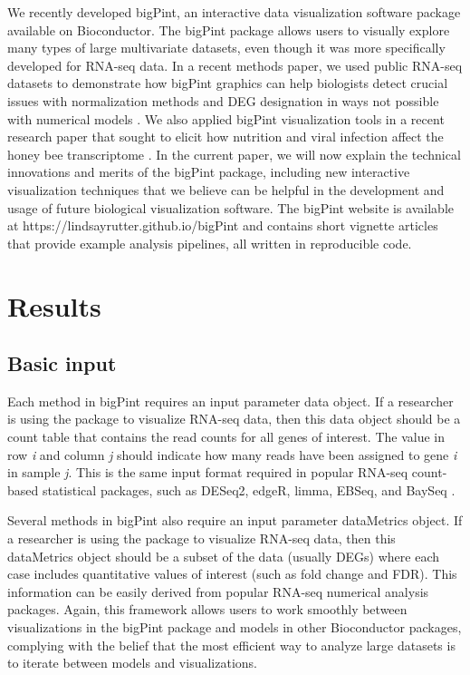 \documentclass[parskip=full]{bmcart} %
\begin{document}
We recently developed bigPint, an interactive data visualization software package available on Bioconductor. The bigPint package allows users to visually explore many types of large multivariate datasets, even though it was more specifically developed for RNA-seq data. In a recent methods paper, we used public RNA-seq datasets to demonstrate how bigPint graphics can help biologists detect crucial issues with normalization methods and DEG designation in ways not possible with numerical models \cite{rutter1}. We also applied bigPint visualization tools in a recent research paper that sought to elicit how nutrition and viral infection affect the honey bee transcriptome \cite{rutter2}. In the current paper, we will now explain the technical innovations and merits of the bigPint package, including new interactive visualization techniques that we believe can be helpful in the development and usage of future biological visualization software. The bigPint website is available at https://lindsayrutter.github.io/bigPint and contains short vignette articles that provide example analysis pipelines, all written in reproducible code.

\section*{Results}

\subsection*{Basic input}

Each method in bigPint requires an input parameter data object. If a researcher is using the package to visualize RNA-seq data, then this data object should be a count table that contains the read counts for all genes of interest. The value in row \textit{i} and column \textit{j} should indicate how many reads have been assigned to gene \textit{i} in sample \textit{j}. This is the same input format required in popular RNA-seq count-based statistical packages, such as DESeq2, edgeR, limma, EBSeq, and BaySeq \cite{deseq2, edger, limma, ebseq, bayseq}. 

Several methods in bigPint also require an input parameter dataMetrics object. If a researcher is using the package to visualize RNA-seq data, then this dataMetrics object should be a subset of the data (usually DEGs) where each case includes quantitative values of interest (such as fold change and FDR). This information can be easily derived from popular RNA-seq numerical analysis packages. Again, this framework allows users to work smoothly between visualizations in the bigPint package and models in other Bioconductor packages, complying with the belief that the most efficient way to analyze large datasets is to iterate between models and visualizations.
\end{document}
